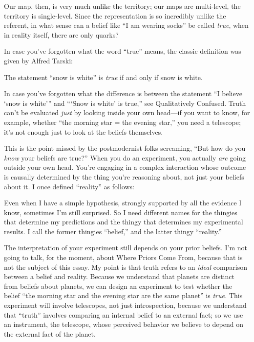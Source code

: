 {
 Our map, then, is very much unlike the territory; our maps are
multi-level, the territory is single-level. Since the representation is
so incredibly unlike the referent, in what sense can a belief like
``I am wearing socks'' be called
\textit{true}, when in reality itself, there are only quarks?}

{
 In case you've forgotten what the word
``true'' means, the classic
definition was given by Alfred Tarski:}

{
 The statement ``snow is white''
is \textit{true} if and only if snow is white.}

{
 In case you've forgotten what the difference is
between the statement ``I believe `snow
is white''' and
```Snow is white' is
true,'' see Qualitatively Confused. Truth
can't be evaluated \textit{just} by looking inside your
own head---if you want to know, for example, whether
``the morning star = the evening
star,'' you need a telescope; it's
not enough just to look at the beliefs themselves.}

{
 This is the point missed by the postmodernist folks screaming,
``But how do you \textit{know} your beliefs are
true?'' When you do an experiment, you actually
\textit{are} going outside your own head. You're
engaging in a complex interaction whose outcome is causally determined
by the thing you're reasoning about, not just your
beliefs about it. I once defined
``reality'' as follows:}

{
 Even when I have a simple hypothesis, strongly supported by all
the evidence I know, sometimes I'm still surprised. So
I need different names for the thingies that determine my predictions
and the thingy that determines my experimental results. I call the
former thingies ``belief,'' and the
latter thingy ``reality.''}

{
 The interpretation of your experiment still depends on your prior
beliefs. I'm not going to talk, for the moment, about
Where Priors Come From, because that is not the subject of this essay.
My point is that truth refers to an \textit{ideal} comparison between a
belief and reality. Because we understand that planets are distinct
from beliefs about planets, we can design an experiment to test whether
the belief ``the morning star and the evening star are
the same planet'' is \textit{true.} This experiment
will involve telescopes, not just introspection, because we understand
that ``truth'' involves comparing an
internal belief to an external fact; so we use an instrument, the
telescope, whose perceived behavior we believe to depend on the
external fact of the planet.}

